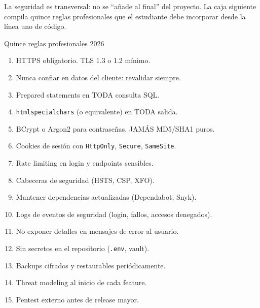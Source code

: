 \documentclass[11pt,a4paper,openany]{book}
\begin{document}
La seguridad es transversal: no se ``añade al final'' del
proyecto. La caja siguiente compila quince reglas profesionales que
el estudiante debe incorporar desde la línea uno de código.


\begin{cajabuenas}{Quince reglas profesionales 2026}
\begin{enumerate}
\item HTTPS obligatorio. TLS 1.3 o 1.2 mínimo.
\item Nunca confiar en datos del cliente: revalidar siempre.
\item Prepared statements en TODA consulta SQL.
\item \texttt{htmlspecialchars} (o equivalente) en TODA salida.
\item BCrypt o Argon2 para contraseñas. JAMÁS MD5/SHA1 puros.
\item Cookies de sesión con \texttt{HttpOnly}, \texttt{Secure},
\texttt{SameSite}.
\item Rate limiting en login y endpoints sensibles.
\item Cabeceras de seguridad (HSTS, CSP, XFO).
\item Mantener dependencias actualizadas (Dependabot, Snyk).
\item Logs de eventos de seguridad (login, fallos, accesos
denegados).
\item No exponer detalles en mensajes de error al usuario.
\item Sin secretos en el repositorio (\texttt{.env}, vault).
\item Backups cifrados y restaurables periódicamente.
\item Threat modeling al inicio de cada feature.
\item Pentest externo antes de release mayor.
\end{enumerate}
\end{cajabuenas}


%
\end{document}
